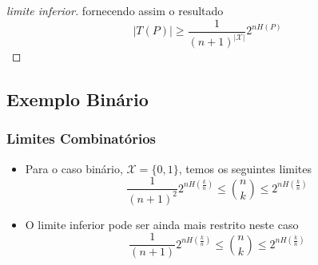 \begin{frame}[allowframebreaks]
\begin{proof}[limite inferior]
  fornecendo assim o resultado
  \begin{equation}
  \vert T(P) \vert \geq \frac{1}{(n+1)^{\vert \mathcal{X} \vert}} 2^{nH(P)}
  \end{equation}
  \end{proof}

\end{frame}

\subsection{Exemplo Binário}
\begin{frame}[allowframebreaks]
  \frametitle{Limites Combinatórios}
  \begin{itemize}
  \item Para o caso binário, $\mathcal{X} = \{0,1\}$, temos os seguintes limites
	\begin{equation}
	\frac{1}{(n+1)^2} 2^{nH(\frac{k}{n})} \leq {n \choose k} \leq 2^{nH(\frac{k}{n})}
	\end{equation}
  \item O limite inferior pode ser ainda mais restrito neste caso 
	\begin{equation}
        \frac{1}{(n+1)} 2^{nH(\frac{k}{n})} \leq {n \choose k} \leq 2^{nH(\frac{k}{n})}
        \end{equation}
  \end{itemize}
\end{frame}

